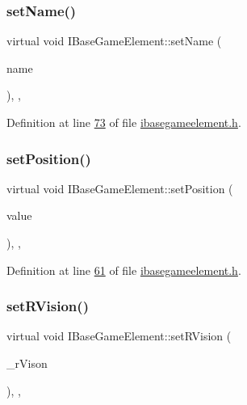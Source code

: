 \subsubsection{\texorpdfstring{set\+Name()}{setName()}}
{\footnotesize\ttfamily virtual void I\+Base\+Game\+Element\+::set\+Name (\begin{DoxyParamCaption}\item[{Q\+String}]{name }\end{DoxyParamCaption})\hspace{0.3cm}{\ttfamily [inline]}, {\ttfamily [virtual]}, {\ttfamily [inherited]}}



Definition at line \hyperlink{a00047_source_l00073}{73} of file \hyperlink{a00047_source}{ibasegameelement.\+h}.

\mbox{\label{a00137_a54dc1a743fac99db03c3f47b5c6d69c4}} 
\subsubsection{\texorpdfstring{set\+Position()}{setPosition()}}
{\footnotesize\ttfamily virtual void I\+Base\+Game\+Element\+::set\+Position (\begin{DoxyParamCaption}\item[{Q\+Vector3D $\ast$}]{value }\end{DoxyParamCaption})\hspace{0.3cm}{\ttfamily [inline]}, {\ttfamily [virtual]}, {\ttfamily [inherited]}}



Definition at line \hyperlink{a00047_source_l00061}{61} of file \hyperlink{a00047_source}{ibasegameelement.\+h}.

\mbox{\label{a00137_a2719e14051c30f39ca60f4998e48abf9}} 
\subsubsection{\texorpdfstring{set\+R\+Vision()}{setRVision()}}
{\footnotesize\ttfamily virtual void I\+Base\+Game\+Element\+::set\+R\+Vision (\begin{DoxyParamCaption}\item[{int}]{\+\_\+r\+Vison }\end{DoxyParamCaption})\hspace{0.3cm}{\ttfamily [inline]}, {\ttfamily [virtual]}, {\ttfamily [inherited]}}




